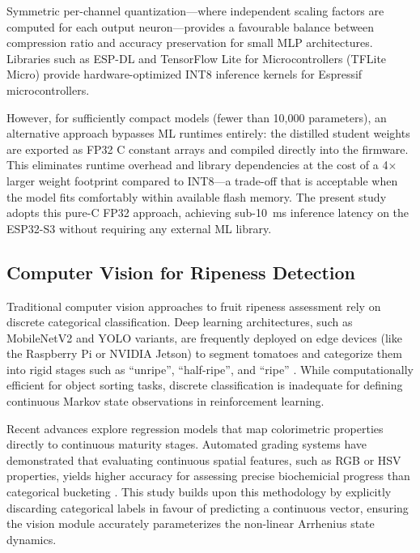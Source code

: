     Symmetric per-channel quantization---where independent scaling factors are computed for each output neuron---provides a favourable balance between compression ratio and accuracy preservation for small MLP architectures. Libraries such as ESP-DL \citep{espdl2024} and TensorFlow Lite for Microcontrollers (TFLite Micro) provide hardware-optimized INT8 inference kernels for Espressif microcontrollers.

    However, for sufficiently compact models (fewer than 10,000 parameters), an alternative approach bypasses ML runtimes entirely: the distilled student weights are exported as FP32 C constant arrays and compiled directly into the firmware. This eliminates runtime overhead and library dependencies at the cost of a 4$\times$ larger weight footprint compared to INT8---a trade-off that is acceptable when the model fits comfortably within available flash memory. The present study adopts this pure-C FP32 approach, achieving sub-10~ms inference latency on the ESP32-S3 without requiring any external ML library.

    \subsection{Computer Vision for Ripeness Detection}

    Traditional computer vision approaches to fruit ripeness assessment rely on discrete categorical classification. Deep learning architectures, such as MobileNetV2 and YOLO variants, are frequently deployed on edge devices (like the Raspberry Pi or NVIDIA Jetson) to segment tomatoes and categorize them into rigid stages such as ``unripe'', ``half-ripe'', and ``ripe'' \citep{jeannoob_yolov8, tomatod_dataset}. While computationally efficient for object sorting tasks, discrete classification is inadequate for defining continuous Markov state observations in reinforcement learning.

    Recent advances explore regression models that map colorimetric properties directly to continuous maturity stages. Automated grading systems have demonstrated that evaluating continuous spatial features, such as RGB or HSV properties, yields higher accuracy for assessing precise biochemicial progress than categorical bucketing \citep{ripeness_regression_cv}. This study builds upon this methodology by explicitly discarding categorical labels in favour of predicting a continuous vector, ensuring the vision module accurately parameterizes the non-linear Arrhenius state dynamics.

